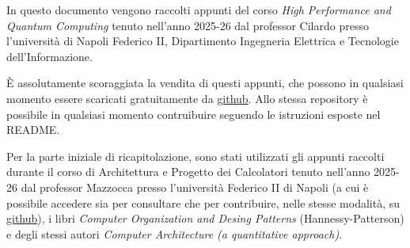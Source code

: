 In questo documento vengono raccolti appunti del corso \textit{High Performance and Quantum Computing} tenuto nell'anno 2025-26 dal professor Cilardo presso l'università di Napoli Federico II, Dipartimento Ingegneria Elettrica e Tecnologie dell'Informazione.

\noindent \uppercase{è} assolutamente scoraggiata la vendita di questi appunti, che possono in qualsiasi momento essere scaricati gratuitamente da \href{https://github.com/h-tajato/hpqc_notes}{github}. Allo stessa repository è possibile in qualsiasi momento contruibuire seguendo le istruzioni esposte nel README.

\noindent Per la parte iniziale di ricapitolazione, sono stati utilizzati gli appunti raccolti durante il corso di Architettura e Progetto dei Calcolatori tenuto nell'anno 2025-26 dal professor Mazzocca presso l'università Federico II di Napoli (a cui è possibile accedere sia per consultare che per contribuire, nelle stesse modalità, su \href{https://github.com/Agda78/APC-appunti}{github}), i libri \textit{Computer Organization and Desing Patterns} (Hannessy-Patterson) e degli stessi autori \textit{Computer Architecture (a quantitative approach)}.
